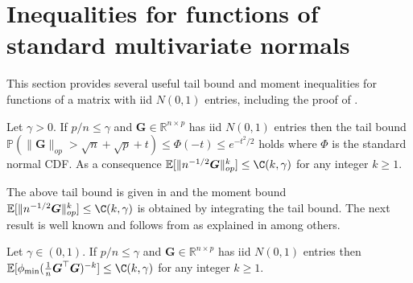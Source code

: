 \documentclass[11pt]{amsart}
\numberwithin{equation}{section}
\numberwithin{equation}{section}
\def\real{{\mathbb{R}}}
\def\R{{\real}}
\def\E{{\mathbb{E}}}
\def\P{{\mathbb{P}}}
\def\mathbold{\boldsymbol} %
\def\bG{\mathbold{G}}\def\calG{{\cal G}}\def\scrG{{\mathscr G}}\def\Ghat{\widehat{G}}\def\Gtil{{\widetilde G}}
\def\calG{{\cal G}}
\begin{document}
\section{Inequalities for functions of standard multivariate normals}
\label{sec:6-identitities-gaussian}

This section provides several useful tail bound and moment
inequalities for functions of a matrix with iid $N(0,1)$ entries,
including the proof of .

\begin{lemma}
    \label{lemma:Davidson}
    Let $\gamma>0$.
    If $p/n\le \gamma$ and
    $\bG\in\R^{n\times p}$ has iid $N(0,1)$ entries then
    the tail bound
    $\P(\|\bG\|_{op}>\sqrt n + \sqrt p + t)\le \Phi(-t)\le e^{-t^2/2}$
    holds
    where $\Phi$ is the standard normal CDF. As a consequence
    $\E[\|n^{-1/2}\bG\|_{op}^k]\le \C(k,\gamma)$ for any integer $k\ge 1$.
\end{lemma}
The above tail bound is given in 
\cite[Theorem II.13]{DavidsonS01} and the moment bound
$\E[\|n^{-1/2}\bG\|_{op}^k]\le \C(k,\gamma)$ is obtained by integrating
the tail bound.
The next result is well known and follows from
\cite{edelman1988eigenvalues} as explained 
in \cite[Proposition A.1]{bellec_zhang2019second_poincare} among others.
\begin{lemma}
    \label{lemma:Edelman}
    Let $\gamma\in(0,1)$.
    If $p/n\le \gamma$ and
    $\bG\in\R^{n\times p}$ has iid $N(0,1)$ entries then
    $\E[\phi_{\min}(\frac 1 n \bG^\top\bG)^{-k}]\le \C(k,\gamma)$ for any integer $k\ge 1$.
\end{lemma}
\end{document}
